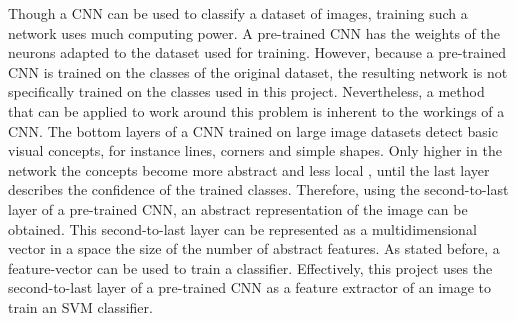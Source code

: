 Though a CNN can be used to classify a dataset of images, training such a network uses much computing power.
A pre-trained CNN has the weights of the neurons adapted to the dataset used for training.
However, because a pre-trained CNN is trained on the classes of the original dataset, the resulting network is not specifically trained on the classes used in this project.
Nevertheless, a method that can be applied to work around this problem is inherent to the workings of a CNN.
The bottom layers of a CNN trained on large image datasets detect basic visual concepts, for instance lines, corners and simple shapes.
Only higher in the network the concepts become more abstract and less local \citep{zeiler2014visualizing}, until the last layer describes the confidence of the trained classes.
Therefore, using the second-to-last layer of a pre-trained CNN, an abstract representation of the image can be obtained.
This second-to-last layer can be represented as a multidimensional vector in a space the size of the number of abstract features.
As stated before, a feature-vector can be used to train a classifier.
Effectively, this project uses the second-to-last layer of a pre-trained CNN as a feature extractor of an image to train an SVM classifier.

